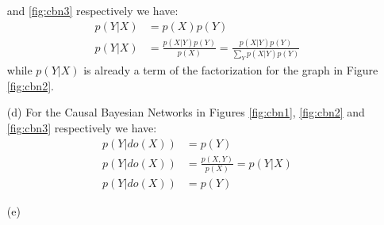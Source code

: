 \documentclass{amsmlaj}
\begin{document}
\begin{problem}
\begin{sol}
\begin{itemize}
			and \ref{fig:cbn3} respectively we have:
			\begin{align}
				p(Y|X) &= p(X)p(Y) \\
				p(Y|X) &= \frac{p(X|Y)p(Y)}{p(X)} = \frac{p(X|Y)p(Y)}{\sum_Y p(X|Y)p(Y)}
			\end{align}
			while $p(Y|X)$ is already a term of the factorization for the graph in
			Figure \ref{fig:cbn2}.
		\item[(d)] For the Causal Bayesian Networks in Figures \ref{fig:cbn1},
			\ref{fig:cbn2} and \ref{fig:cbn3} respectively we have:
			\begin{align}
				p(Y|do(X)) &= p(Y) \\
				p(Y|do(X)) &= \frac{p(X,Y)}{p(X)} = p(Y|X) \\
				p(Y|do(X)) &= p(Y)
			\end{align}
		\item[(e)] %
	\end{itemize}
\end{sol}
\end{problem}
\end{document}
